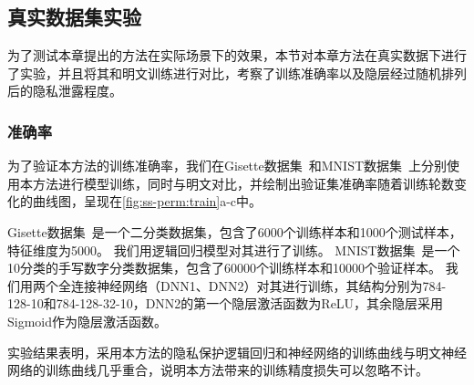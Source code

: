 \subsection{真实数据集实验}
为了测试本章提出的方法在实际场景下的效果，本节对本章方法在真实数据下进行了实验，并且将其和明文训练进行对比，考察了训练准确率以及隐层经过随机排列后的隐私泄露程度。

\subsubsection{准确率}
为了验证本方法的训练准确率，我们在Gisette数据集~\cite{2008_gisette}和MNIST数据集~\cite{mnist}上分别使用本方法进行模型训练，同时与明文对比，并绘制出验证集准确率随着训练轮数变化的曲线图，呈现在\autoref{fig:ss-perm:train}a-c中。

%
Gisette数据集~\cite{2008_gisette}是一个二分类数据集，包含了6000个训练样本和1000个测试样本，特征维度为5000。
我们用逻辑回归模型对其进行了训练。
%
MNIST数据集~\cite{mnist}是一个10分类的手写数字分类数据集，包含了60000个训练样本和10000个验证样本。
我们用两个全连接神经网络（DNN1、DNN2）对其进行训练，其结构分别为784-128-10和784-128-32-10，DNN2的第一个隐层激活函数为ReLU，其余隐层采用Sigmoid作为隐层激活函数。

实验结果表明，采用本方法的隐私保护逻辑回归和神经网络的训练曲线与明文神经网络的训练曲线几乎重合，说明本方法带来的训练精度损失可以忽略不计。

